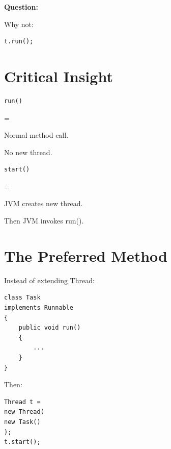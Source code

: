 \documentclass[11pt,a4paper]{book}
\begin{document}

\textbf{Question:}

Why not:

\begin{verbatim} 
t.run();
\end{verbatim}


\section{Critical Insight}

\begin{verbatim} 
run()
\end{verbatim}

=

Normal method call.


No new thread.


\begin{verbatim} 
start()
\end{verbatim}

=

JVM creates new thread.


Then JVM invokes run().


\section{The Preferred Method}

Instead of extending Thread:

\begin{verbatim} 
class Task
implements Runnable
{
    public void run()
    {
        ...
    }
}
\end{verbatim}


Then:

\begin{verbatim} 
Thread t =
new Thread(
new Task()
);
t.start();
\end{verbatim}
\end{document}
